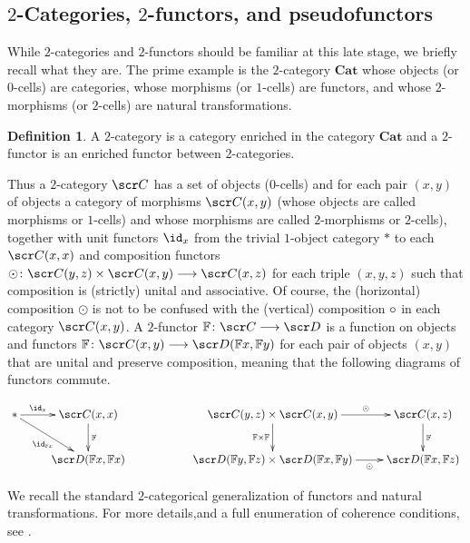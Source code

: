 \documentclass{amsart}
\theoremstyle{definition}
\newtheorem{defn}{Definition}[section]
\numberwithin{equation}{section}
\begin{document}
\subsection{$2$-Categories, $2$-functors, and pseudofunctors}\label{2Cats}
While $2$-categories and $2$-functors should be familiar at this late stage, we briefly recall what they are.  The prime example is the $2$-category $\mathbf{Cat}$  whose objects (or $0$-cells) are categories, whose morphisms (or $1$-cells) are functors, and whose $2$-morphisms (or $2$-cells) are natural transformations.    
\begin{defn} A $2$-category is a category enriched in the category $\mathbf{Cat}$ and a $2$-functor is an enriched functor between $2$-categories.
\end{defn}
Thus a $2$-category $\sC$ has a set of objects ($0$-cells) and for each pair $(x,y)$ of objects a category of morphisms $\sC(x,y)$ (whose objects are called morphisms or $1$-cells) and whose morphisms are called $2$-morphisms or $2$-cells), together with unit functors $\id_x$ from the trivial $1$-object category $\ast$ to each $\sC(x,x)$ and composition functors $\odot \colon \sC(y,z)\times \sC(x,y) \rtarr \sC(x,z)$ for each triple $(x,y,z)$  such that composition is (strictly) unital and associative.   Of course, the (horizontal) composition $\odot$ is not to be confused with the (vertical) composition $\circ$ in each category $\sC(x,y)$.  A $2$-functor 
$\bF\colon \sC\rtarr \sD$ is a function on objects and functors $\bF\colon \sC(x,y)\rtarr \sD(\bF x, \bF y)$ for each pair of objects 
$(x,y)$ that are unital and preserve composition, meaning  that the following diagrams of functors commute.

\begin{equation}\label{2fun}
\xymatrix{
\ast\ar[r]^-{\id_x} \ar[dr]_{\id_{\bF x}} & \sC(x,x) \ar[d]^{\bF}  
& & \sC(y,z) \times \sC(x,y) \ar[d]_{\bF\times\bF} \ar[r]^-{\odot} & \sC(x,z) \ar[d]^{\bF}\\
& \sD(\bF x,\bF x) & & \sD(\bF y, \bF z) \times \sD(\bF x, \bF y) \ar[r]_-{\odot} & \sD(\bF x, \bF z)\\} 
\end{equation}

We recall the standard $2$-categorical generalization of functors and natural transformations.
For more details,and a full enumeration of coherence conditions, see \cite[Sections 4.1, 4.2]{JY}.
\end{document}
